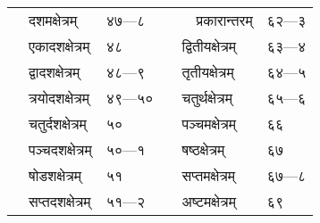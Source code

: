 \documentclass[11pt, openany]{book}
\begin{document}
\begin{center}
\begin{tabular}{p{1.5in} l | p{1.5in} l}
~~दशमक्षेत्रम् & ४७---८ & ~~~~प्रकारान्तरम् & ६२---३\\
~~एकादशक्षेत्रम् & ४८ & ~~द्वितीयक्षेत्रम् & ६३---४\\
~~द्वादशक्षेत्रम् & ४८---९ & ~~तृतीयक्षेत्रम् & ६४---५\\
~~त्रयोदशक्षेत्रम् & ४९---५० & ~~चतुर्थक्षेत्रम् & ६५---६\\
~~चतुर्दशक्षेत्रम् & ५० & ~~पञ्चमक्षेत्रम् & ६६\\
~~पञ्चदशक्षेत्रम् & ५०---१ & ~~षष्ठक्षेत्रम् & ६७\\
~~षोडशक्षेत्रम् & ५१ & ~~सप्तमक्षेत्रम् & ६७---८\\
~~सप्तदशक्षेत्रम् & ५१---२ & ~~अष्टमक्षेत्रम् & ६९\\
\end{tabular}
\end{center}
\end{document}
